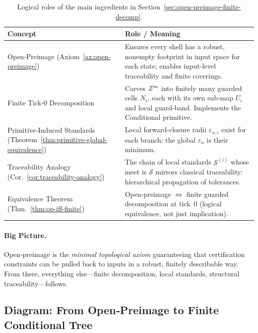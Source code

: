 \documentclass[12pt]{article}
\theoremstyle{definition}
\theoremstyle{plain}
\begin{document}
\begin{table}[h!]
\centering
\renewcommand{\arraystretch}{1.2}
\begin{tabular}{p{3.6cm} p{9.8cm}}
\hline
\textbf{Concept} & \textbf{Role / Meaning}\\
\hline
Open‑Preimage (Axiom~\ref{ax:open-preimage}) 
& Ensures every shell has a robust, nonempty footprint in input space for each state; enables input‑level traceability and finite coverings.\\

Finite Tick‑0 Decomposition 
& Carves $\mathcal Z^{\rm in}$ into finitely many guarded cells $N_i$, each with its own sub‑map $U_i$ and local guard‑band. Implements the Conditional primitive.\\

Primitive‑Induced Standards (Theorem~\ref{thm:primitive-global-equivalence}) 
& Local forward‑closure radii $\varepsilon_{n,i}$ exist for each branch; the global $\varepsilon_n$ is their minimum.\\

Traceability Analogy (Cor.~\ref{cor:traceability-analogy}) 
& The chain of local standards $\mathcal S^{(i)}$ whose meet is $\mathcal S$ mirrors classical traceability: hierarchical propagation of tolerances.\\

Equivalence Theorem (Thm.~\ref{thm:op-iff-finite}) 
& Open‑preimage $\Longleftrightarrow$ finite guarded decomposition at tick 0 (logical equivalence, not just implication).\\
\hline
\end{tabular}
\caption{Logical roles of the main ingredients in Section~\ref{sec:open-preimage-finite-decomp}.}
\end{table}

\paragraph{Big Picture.}  
Open‑preimage is the \emph{minimal topological axiom} guaranteeing that certification constraints can be pulled back to inputs in a robust, finitely describable way. From there, everything else—finite decomposition, local standards, structural traceability—follows.

\subsection{Diagram: From Open‑Preimage to Finite Conditional Tree}
\label{subsec:diagram-tree}
\end{document}
